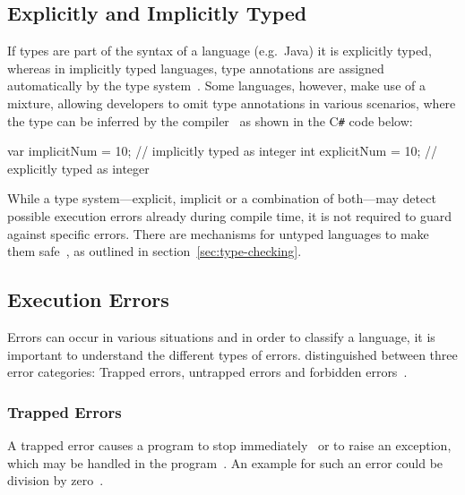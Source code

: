 
\subsection{Explicitly and Implicitly Typed}
\label{sec:explicitly-implicitly-typed}

If types are part of the syntax of a language (e.g.\ Java) it is explicitly typed, whereas in implicitly typed languages, type annotations are assigned automatically by the type system~\cite[pp.~2,~3]{TypeSystems:Cardelli:2004}. Some languages, however, make use of a mixture, allowing developers to omit type annotations in various scenarios, where the type can be inferred by the compiler~\cite[p.~10]{TypesAndProgrammingLanguages:Pierce:2002} as shown in the C\texttt{\#} code below:
\begin{CsCode}[numbers=none]
var implicitNum = 10; // implicitly typed as integer
int explicitNum = 10; // explicitly typed as integer
\end{CsCode}
While a type system---explicit, implicit or a combination of both---may detect possible execution errors already during compile time, it is not required to guard against specific errors. There are mechanisms for untyped languages to make them safe~\cite[p.~3]{TypeSystems:Cardelli:2004}, as outlined in section~\ref{sec:type-checking}.

\subsection{Execution Errors}
\label{sec:execution-errors}
Errors can occur in various situations and in order to classify a language, it is important to understand the different types of errors. \citeauthor{TypeSystems:Cardelli:2004} distinguished between three error categories: Trapped errors, untrapped errors and forbidden errors~\cite[p.~3]{TypeSystems:Cardelli:2004}.

\subsubsection{Trapped Errors}

A trapped error causes a program to stop immediately~\cite[p.~3]{TypeSystems:Cardelli:2004} or to raise an exception, which may be handled in the program~\cite[p.~7]{TypesAndProgrammingLanguages:Pierce:2002}. An example for such an error could be division by zero~\cite[p.~3]{TypeSystems:Cardelli:2004}.

